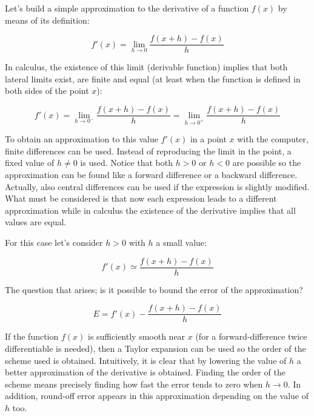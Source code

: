 Let's build a simple approximation to the derivative of a function $ f(x) $ by means of its definition:

\begin{equation}
    f'(x) = \lim_{h\rightarrow 0}\frac{f(x+h)-f(x)}{h}
\end{equation}

In calculus, the existence of this limit (derivable function) implies that both lateral limits exist, are finite and equal (at least when the function is defined in both sides of the point $x$):

\begin{equation}
    f'(x) = \lim_{h\rightarrow 0^-}\frac{f(x+h)-f(x)}{h} = \lim_{h\rightarrow 0^+}\frac{f(x+h)-f(x)}{h}
\end{equation}

To obtain an approximation to this value $ f'(x) $ in a point $x $ with the computer, finite differences can be used. Instead of reproducing the limit in the point, a fixed value of $ h \neq 0$ is used. Notice that both $ h > 0 $ or $ h < 0 $ are possible so the approximation can be found like a forward difference or a backward difference. Actually, also central differences can be used if the expression is slightly modified. What must be considered is that now each expression leads to a different approximation while in calculus the existence of the derivative implies that all values are equal. 

For this case let's consider $ h > 0 $ with $h$ a small value:

\begin{equation}
    f'(x) \simeq \frac{f(x+h)-f(x)}{h}
\end{equation}

The question that arises; is it possible to bound the error of the approximation? 

\begin{equation}
    E = f'(x) - \frac{f(x+h)-f(x)}{h}
\end{equation}

If the function $f(x)$ is sufficiently smooth near $x$ (for a forward-difference twice differentiable is needed), then a Taylor expansion can be used so the order of the scheme used is obtained. Intuitively, it is clear that by lowering the value of $h$ a better approximation of the derivative is obtained. Finding the order of the scheme means precisely finding how fast the error tends to zero when $h\rightarrow 0$. In addition, round-off error appears in this approximation depending on the value of $h$ too.

